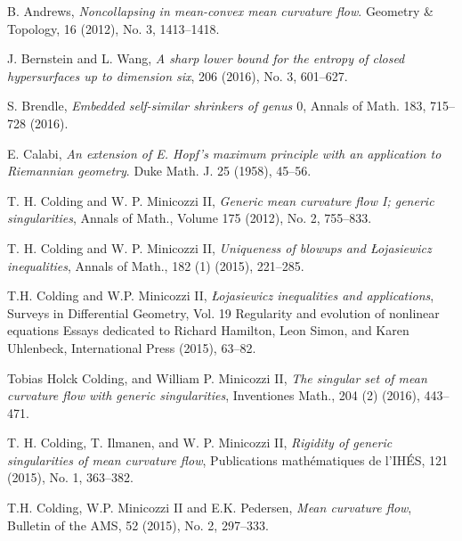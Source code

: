 \documentclass{amsart}
\theoremstyle{definition}
\begin{document}
 \begin{thebibliography}{A}

B. Andrews, {\emph{Noncollapsing in mean-convex mean curvature flow}}. 
Geometry \& Topology, 16 (2012), No. 3, 1413--1418.
 
J. Bernstein and L. Wang, \emph{A sharp lower bound for the entropy of closed hypersurfaces up to dimension six}, 
206 (2016), No. 3, 601--627.

S. Brendle, \emph{Embedded self-similar shrinkers of genus $0$}, Annals of Math. 183, 715--728 (2016).

E. Calabi, \emph{An extension of E. Hopf's maximum principle with an application to Riemannian geometry}.
Duke Math. J. 25 (1958), 45--56.

T. H. Colding and W. P. Minicozzi II,
\emph{Generic mean curvature flow I; generic singularities},  Annals of Math., Volume 175 (2012), No. 2, 755--833.

T. H. Colding and W. P. Minicozzi II, \emph{Uniqueness of blowups and \L{}ojasiewicz inequalities}, Annals of Math., 182 (1) (2015), 221--285.

T.H. Colding and W.P. Minicozzi II, \emph{\L{}ojasiewicz inequalities and applications}, Surveys in Differential Geometry, Vol. 19
Regularity and evolution of nonlinear equations
Essays dedicated to Richard Hamilton, Leon Simon, and Karen Uhlenbeck, International Press (2015), 63--82.

Tobias Holck Colding, and William P. Minicozzi II, \emph{The singular set of mean curvature flow with generic singularities}, 
Inventiones Math., 204 (2) (2016), 443--471.
 
  T. H. Colding, T. Ilmanen, and W. P. Minicozzi II, {\emph{Rigidity of generic singularities of mean curvature flow}}, 
 Publications math\'{e}matiques de l'IH\'{E}S,  121 (2015), No. 1, 363--382.
 
 
T.H. Colding, W.P. Minicozzi II and E.K. Pedersen, {\emph{Mean curvature flow}}, Bulletin of the AMS, 52 (2015), No. 2, 297--333.



\end{thebibliography}
\end{document}

